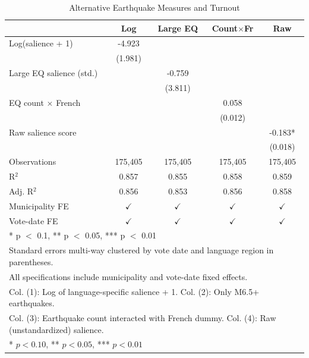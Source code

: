 \begin{table}
\centering
\caption{Alternative Earthquake Measures and Turnout \label{tab:altinst}}
\centering
\begin{tabular}[t]{lcccc}
\toprule
  & Log & Large EQ & Count$\times$Fr & Raw\\
\midrule
Log(salience + 1) & -4.923 &  &  & \\
 & (1.981) &  &  & \\
Large EQ salience (std.) &  & -0.759 &  & \\
 &  & (3.811) &  & \\
EQ count $\times$ French &  &  & 0.058 & \\
 &  &  & (0.012) & \\
Raw salience score &  &  &  & -0.183*\\
 &  &  &  & (0.018)\\
\midrule
Observations & 175,405 & 175,405 & 175,405 & 175,405\\
R$^2$ & 0.857 & 0.855 & 0.858 & 0.859\\
Adj. R$^2$ & 0.856 & 0.853 & 0.856 & 0.858\\
Municipality FE & $\checkmark$ & $\checkmark$ & $\checkmark$ & $\checkmark$\\
Vote-date FE & $\checkmark$ & $\checkmark$ & $\checkmark$ & $\checkmark$\\
\bottomrule
\multicolumn{5}{p{0.95\textwidth}}{\rule{0pt}{1em}* p $<$ 0.1, ** p $<$ 0.05, *** p $<$ 0.01}\\
\multicolumn{5}{p{0.95\textwidth}}{\rule{0pt}{1em}Standard errors multi-way clustered by vote date and language region in parentheses.}\\
\multicolumn{5}{p{0.95\textwidth}}{\rule{0pt}{1em}All specifications include municipality and vote-date fixed effects.}\\
\multicolumn{5}{p{0.95\textwidth}}{\rule{0pt}{1em}Col. (1): Log of language-specific salience + 1. Col. (2): Only M6.5+ earthquakes.}\\
\multicolumn{5}{p{0.95\textwidth}}{\rule{0pt}{1em}Col. (3): Earthquake count interacted with French dummy. Col. (4): Raw (unstandardized) salience.}\\
\multicolumn{5}{p{0.95\textwidth}}{\rule{0pt}{1em}* $p<0.10$, ** $p<0.05$, *** $p<0.01$}\\
\end{tabular}
\end{table}
